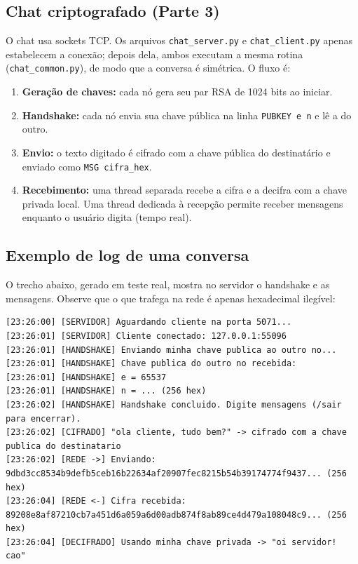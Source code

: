 \documentclass[11pt, a4paper]{article}
\begin{document}
\subsection{Chat criptografado (Parte 3)}
O chat usa sockets TCP. Os arquivos \texttt{chat\_server.py} e \texttt{chat\_client.py} apenas estabelecem a conexão; depois dela, ambos executam a mesma rotina (\texttt{chat\_common.py}), de modo que a conversa é simétrica. O fluxo é:
\begin{enumerate}
    \item \textbf{Geração de chaves:} cada nó gera seu par RSA de 1024 bits ao iniciar.
    \item \textbf{Handshake:} cada nó envia sua chave pública na linha \texttt{PUBKEY e n} e lê a do outro.
    \item \textbf{Envio:} o texto digitado é cifrado com a chave pública do destinatário e enviado como \texttt{MSG cifra\_hex}.
    \item \textbf{Recebimento:} uma thread separada recebe a cifra e a decifra com a chave privada local. Uma thread dedicada à recepção permite receber mensagens enquanto o usuário digita (tempo real).
\end{enumerate}

\subsection{Exemplo de log de uma conversa}
O trecho abaixo, gerado em teste real, mostra no servidor o handshake e as mensagens. Observe que o que trafega na rede é apenas hexadecimal ilegível:

\begin{lstlisting}[style=logstyle]
[23:26:00] [SERVIDOR] Aguardando cliente na porta 5071...
[23:26:01] [SERVIDOR] Cliente conectado: 127.0.0.1:55096
[23:26:01] [HANDSHAKE] Enviando minha chave publica ao outro no...
[23:26:01] [HANDSHAKE] Chave publica do outro no recebida:
[23:26:01] [HANDSHAKE] e = 65537
[23:26:01] [HANDSHAKE] n = ... (256 hex)
[23:26:02] [HANDSHAKE] Handshake concluido. Digite mensagens (/sair para encerrar).
[23:26:02] [CIFRADO] "ola cliente, tudo bem?" -> cifrado com a chave publica do destinatario
[23:26:02] [REDE ->] Enviando: 9dbd3cc8534b9defb5ceb16b22634af20907fec8215b54b39174774f9437... (256 hex)
[23:26:04] [REDE <-] Cifra recebida: 89208e8af87210cb7a451d6a059a6d00adb874f8ab89ce4d479a108048c9... (256 hex)
[23:26:04] [DECIFRADO] Usando minha chave privada -> "oi servidor! cao"
\end{lstlisting}
\end{document}
